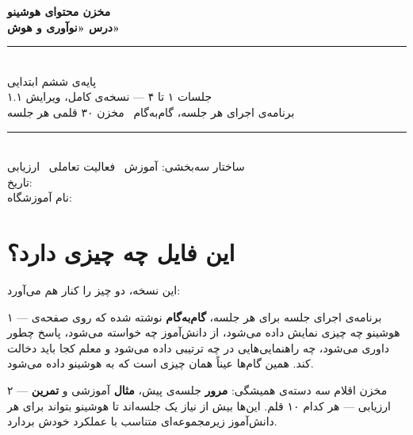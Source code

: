 \documentclass[11pt,a4paper]{article}
\newcommand{\software}{هوشینو}
\newcommand{\payeh}{پایه‌ی ششم ابتدایی}
\begin{document}
\begin{titlepage}
\centering
\vspace*{3cm}
{\Huge\bfseries\textcolor{maincol}{مخزن محتوای \software}}\\[0.8cm]
{\Huge\bfseries درس «نوآوری و هوش»}\\[1.2cm]
\rule{0.75\textwidth}{1pt}\\[0.8cm]
{\LARGE \payeh}\\[0.5cm]
{\Large جلسات ۱ تا ۴ — نسخه‌ی کامل، ویرایش ۱.۱}\\[1cm]
{\large برنامه‌ی اجرای هر جلسه، گام‌به‌گام \textbar\ مخزن ۳۰ قلمی هر جلسه}\\[1.5cm]
\rule{0.75\textwidth}{1pt}\\[1.5cm]
{\large ساختار سه‌بخشی: آموزش \textbar\ فعالیت تعاملی \textbar\ ارزیابی}\\
\vfill
{\large تاریخ: \makebox[3cm]{\dotfill}}\\[0.4cm]
{\large نام آموزشگاه: \makebox[5cm]{\dotfill}}\\[1cm]
\end{titlepage}

\section{این فایل چه چیزی دارد؟}

این نسخه، دو چیز را کنار هم می‌آورد:

\begin{fasl}{۱ — برنامه‌ی اجرای جلسه}
برای هر جلسه، \textbf{گام‌به‌گام} نوشته شده که روی صفحه‌ی \software{} چه چیزی
نمایش داده می‌شود، از دانش‌آموز چه خواسته می‌شود، پاسخ چطور داوری می‌شود، چه
راهنمایی‌هایی در چه ترتیبی داده می‌شود و معلم کجا باید دخالت کند.
همین گام‌ها عیناً همان چیزی است که به \software{} داده می‌شود.
\end{fasl}

\begin{fasl}{۲ — مخزن اقلام}
سه دسته‌ی همیشگی: \textbf{مرور} جلسه‌ی پیش، \textbf{مثال} آموزشی و
\textbf{تمرین} ارزیابی — هر کدام ۱۰ قلم. این‌ها بیش از نیاز یک جلسه‌اند تا
\software{} بتواند برای هر دانش‌آموز زیرمجموعه‌ای متناسب با عملکرد خودش بردارد.
\end{fasl}
\end{document}
